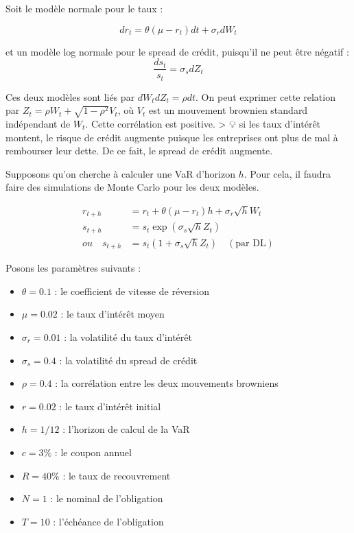 \documentclass[
  letterpaper,
  DIV=11,
  numbers=noendperiod]{scrartcl}
\providecommand{\tightlist}{%
  \setlength{\itemsep}{0pt}\setlength{\parskip}{0pt}}\usepackage{longtable,booktabs,array}
\begin{document}
Soit le modèle normale pour le taux :

\[
dr_t = \theta (\mu - r_t) dt + \sigma_r dW_t
\]

et un modèle log normale pour le spread de crédit, puisqu'il ne peut
être négatif : \[
\frac{ds_t}{s_t} = \sigma_s dZ_t
\]

Ces deux modèles sont liés par \(dW_t dZ_t = \rho dt\). On peut exprimer
cette relation par \(Z_t = \rho W_t + \sqrt{1 - \rho^2} V_t\), où
\(V_t\) est un mouvement brownien standard indépendant de \(W_t\). Cette
corrélation est positive. \textgreater{} 💡 si les taux d'intérêt
montent, le risque de crédit augmente puisque les entreprises ont plus
de mal à rembourser leur dette. De ce fait, le spread de crédit
augmente.

Supposons qu'on cherche à calculer une VaR d'horizon \(h\). Pour cela,
il faudra faire des simulations de Monte Carlo pour les deux modèles.

\[
\begin{aligned}
r_{t+h} &= r_t + \theta (\mu - r_t) h + \sigma_r \sqrt{h} W_t \\
s_{t+h} &= s_t \exp(\sigma_s \sqrt{h} Z_t) \\
ou \quad s_{t+h} &= s_t (1 + \sigma_s \sqrt{h} Z_t) \quad (\text{par DL})
\end{aligned}
\]

Posons les paramètres suivants :

\begin{itemize}
\tightlist
\item
  \(\theta = 0.1\) : le coefficient de vitesse de réversion
\item
  \(\mu = 0.02\) : le taux d'intérêt moyen
\item
  \(\sigma_r = 0.01\) : la volatilité du taux d'intérêt
\item
  \(\sigma_s = 0.4\) : la volatilité du spread de crédit
\item
  \(\rho = 0.4\) : la corrélation entre les deux mouvements browniens
\item
  \(r = 0.02\) : le taux d'intérêt initial
\item
  \(h = 1/12\) : l'horizon de calcul de la VaR
\item
  \(c = 3\%\) : le coupon annuel
\item
  \(R = 40\%\) : le taux de recouvrement
\item
  \(N = 1\) : le nominal de l'obligation
\item
  \(T = 10\) : l'échéance de l'obligation
\end{itemize}
\end{document}
